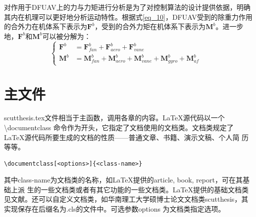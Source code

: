 对作用于DFUAV上的力与力矩进行分析是为了对控制算法的设计提供依据，明确其内在机理可以更好地分析运动特性。根据式\eqref{eq_10}，DFUAV受到的除重力作用的合外力在机体系下表示为$\boldsymbol{F}^b$，受到的合外力矩在机体系下表示为$\boldsymbol{M}^b$。进一步地，$\boldsymbol{F}^b$和$\boldsymbol{M}^b$可以被分解为：
\begin{equation}
    \left\{
    \begin{aligned}
        \boldsymbol{F}^b&=\boldsymbol{F}_{fan}^b+\boldsymbol{F}_{aero}^b+\boldsymbol{F}_{vane}^b \\
        \boldsymbol{M}^b&=\boldsymbol{M}_{fan}^b+\boldsymbol{M}_{aero}^b+\boldsymbol{M}_{vane}^b+\boldsymbol{M}_{gyro}^b+\boldsymbol{M}_{af}^b & 
    \end{aligned}
\right.
\label{eq_11}
\end{equation}















\section{主文件}
scutthesis.tex文件相当于主函数，调用各章的内容。\LaTeX{}源代码以一个\textbackslash{}documentclass 命令作为开头，它指定了文档使用的文档类。文档类规定了\LaTeX{}源代码所要生成的文档的性质——普通文章、书籍、演示文稿、个人简
历等等。
\begin{lstlisting}
\documentclass[<options>]{<class-name>}
\end{lstlisting}
其中class-name为文档类的名称，如\LaTeX{}提供的article, book, report，可在其基础上派
生的一些文档类或者有其它功能的一些文档类。\LaTeX{}提供的基础文档类见文献\parencite{_c}。还可以自定义文档类，如华南理工大学硕博士论文文档类scutthesis，其实现保存在后缀名为.cls的文件中。可选参数options 为文档类指定选项。


